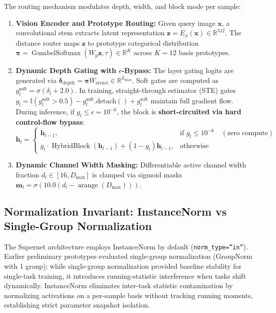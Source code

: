 \documentclass[11pt, a4paper]{article}
\begin{document}
The routing mechanism modulates depth, width, and block mode per sample:
\begin{enumerate}
    \item \textbf{Vision Encoder and Prototype Routing:} Given query image $\mathbf{x}$, a convolutional stem extracts latent representation $\mathbf{z} = E_\phi(\mathbf{x}) \in \mathbb{R}^{512}$. The distance router maps $\mathbf{z}$ to prototype categorical distribution $\boldsymbol{\pi} = \operatorname{GumbelSoftmax}(W_p \mathbf{z}, \tau) \in \mathbb{R}^K$ across $K = 12$ basis prototypes.
    \item \textbf{Dynamic Depth Gating with $\epsilon$-Bypass:} The layer gating logits are generated via $\boldsymbol{\delta}_{\text{depth}} = \boldsymbol{\pi} W_{\text{struct}} \in \mathbb{R}^{L_{\max}}$. Soft gates are computed as $g_l^{\text{soft}} = \sigma(\delta_l + 2.0)$. In training, straight-through estimator (STE) gates $g_l = \mathbb{I}(g_l^{\text{soft}} > 0.5) - g_l^{\text{soft}}.\text{detach}() + g_l^{\text{soft}}$ maintain full gradient flow. During inference, if $g_l \le \epsilon = 10^{-6}$, the block is \textbf{short-circuited via hard control-flow bypass}:
    \begin{equation}
        \mathbf{h}_l = \begin{cases}
            \mathbf{h}_{l-1}, & \text{if } g_l \le 10^{-6} \quad (\text{zero compute}) \\
            g_l \cdot \operatorname{HybridBlock}(\mathbf{h}_{l-1}) + (1 - g_l) \mathbf{h}_{l-1}, & \text{otherwise}
        \end{cases}
    \end{equation}
    \item \textbf{Dynamic Channel Width Masking:} Differentiable active channel width fraction $d_l \in [16, D_{\max}]$ is clamped via sigmoid masks $\mathbf{m}_l = \sigma(10.0(d_l - \operatorname{arange}(D_{\max})))$.
\end{enumerate}

\subsection{Normalization Invariant: InstanceNorm vs Single-Group Normalization}
\label{sec:normalization}

The Supernet architecture employs InstanceNorm by default (\texttt{norm\_type=''in''}). Earlier preliminary prototypes evaluated single-group normalization (GroupNorm with 1 group); while single-group normalization provided baseline stability for single-task training, it introduces running-statistic interference when tasks shift dynamically. InstanceNorm eliminates inter-task statistic contamination by normalizing activations on a per-sample basis without tracking running moments, establishing strict parameter snapshot isolation.
\end{document}
